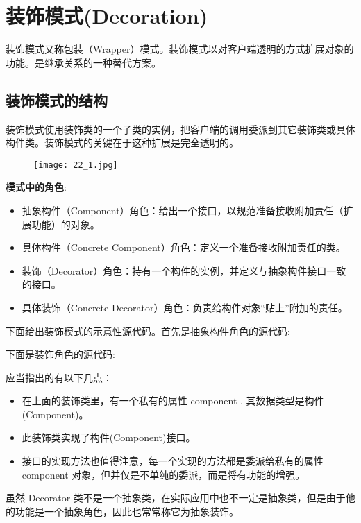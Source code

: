 \documentclass[../main.tex]{subfiles}
\begin{document}
\section{装饰模式(Decoration)}
\noindent 装饰模式又称包装（Wrapper）模式。装饰模式以对客户端透明的方式扩展对象的功能。是继承关系的一种替代方案。
%
\subsection{装饰模式的结构}
装饰模式使用装饰类的一个子类的实例，把客户端的调用委派到其它装饰类或具体构件类。装饰模式的关键在于这种扩展是完全透明的。
%
\begin{figure}[H]
  \texttt{[image: 22\_1.jpg]}
\end{figure}
%
\textbf{模式中的角色}:
\begin{itemize}
  \item 抽象构件（Component）角色：给出一个接口，以规范准备接收附加责任（扩展功能）的对象。
  \item 具体构件（Concrete Component）角色：定义一个准备接收附加责任的类。
  \item 装饰（Decorator）角色：持有一个构件的实例，并定义与抽象构件接口一致的接口。
  \item 具体装饰（Concrete Decorator）角色：负责给构件对象``贴上''附加的责任。
\end{itemize}
%
下面给出装饰模式的示意性源代码。首先是抽象构件角色的源代码:
%

%
下面是装饰角色的源代码:
%

%
应当指出的有以下几点：
\begin{itemize}
  \item 在上面的装饰类里，有一个私有的属性 component , 其数据类型是构件(Component)。
  \item 此装饰类实现了构件(Component)接口。
  \item 接口的实现方法也值得注意，每一个实现的方法都是委派给私有的属性 component 对象，但并仅是不单纯的委派，而是将有功能的增强。
\end{itemize}
%
虽然 Decorator 类不是一个抽象类，在实际应用中也不一定是抽象类，但是由于他的功能是一个抽象角色，因此也常常称它为抽象装饰。
\end{document}
